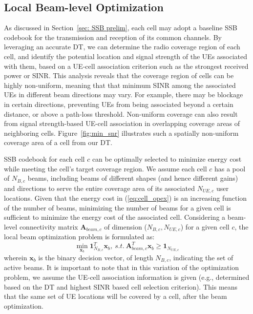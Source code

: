 \subsection{Local Beam-level Optimization}
As discussed in Section~\ref{sec: SSB prelim}, each cell may adopt a baseline SSB codebook for the transmission and reception of its common channels. 
By leveraging an accurate DT, we can determine the radio coverage region of each cell, and identify the potential location and signal strength of the UEs associated with them, based on a UE-cell association criterion such as the strongest received power or SINR.
This analysis reveals that the coverage region of cells can be highly non-uniform, meaning that that minimum SINR among the associated UEs in different beam directions may vary. For example, there may be blockage in certain directions, preventing UEs from being associated beyond a certain distance, or above a path-loss threshold. Non-uniform coverage can also result from signal strength-based UE-cell association in overlapping coverage areas of neighboring cells. Figure~\ref{fig:min_snr} illustrates such a spatially non-uniform coverage area of a cell from our DT. 

SSB codebook for each cell $c$ can be optimally selected to minimize energy cost while meeting the cell's target coverage region. We assume each cell $c$ has a pool of $N_{B,c}$ beams, including beams of different shapes (and hence different gains) and directions to serve the entire coverage area of its associated $N_{UE,c}$ user locations.
 Given that the energy cost in (\ref{eq:cell_opex}) is an increasing function of the number of beams, minimizing the number of beams for a given cell is sufficient to minimize the energy cost of the associated cell. Considering a beam-level connectivity matrix $\bm{A}_{beam, c}$ of dimension ($N_{B,c}, N_{UE,c}$) for a given cell $c$, the local beam optimization problem is formulated as:
\begin{equation}\label{eq:beam_per_sector}
    \min_{\bm{x}_{b}} \bm{1}^T_{N_{B,c}}\bm{x}_b, ~s.t. ~ {\bm{A}^T_{beam,c}}\bm{x}_b \ge \bm{1}_{N_{UE,c}}
\end{equation}
wherein $\bm{x}_b$ is the binary decision vector, of length $N_{B,c}$, indicating the set of active beams. 
It is important to note that in this variation of the optimization problem, we assume the UE-cell association information is given (e.g., determined based on the DT and highest SINR based cell selection criterion). This means that the same set of UE locations will be covered by a cell, after the beam optimization. 

